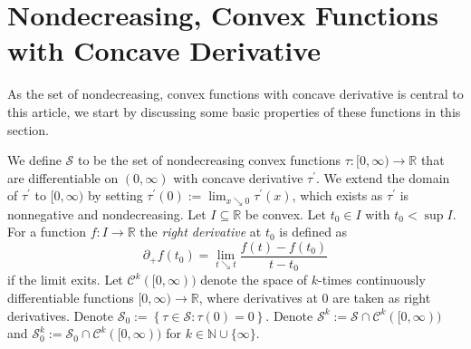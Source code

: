 \documentclass{article}
\renewcommand{\subset}{\subseteq}
\newcommand{\lcb}{\left\lbrace} %
\newcommand{\rcb}{\right\rbrace} %
\newcommand{\cb}[1]{\lcb #1 \rcb} %
\newcommand*{\mc}[1]{\mathcal{#1}}
\newcommand{\N}{\mathbb{N}}
\newcommand{\R}{\mathbb{R}}
\newcommand{\Rp}{[0, \infty)} %
\newcommand{\Rpp}{(0, \infty)} %
\newcommand{\pr}{^\prime}
\newcommand{\tran}{\tau}
\newcommand{\dtran}{\tran\pr}
\newcommand{\setcc}{\mc S}
\newcommand{\setd}[1]{\mc C^{#1}}
\newcommand{\setccd}[1]{\mc S^{#1}}
\newcommand{\setcco}{\mc S_0}
\newcommand{\setccod}[1]{\mc S_0^{#1}}
\begin{document}
\section{Nondecreasing, Convex Functions with Concave Derivative}\label{sec:cc}
%
As the set of nondecreasing, convex functions with concave derivative is central to this article, we start by discussing some basic properties of these functions in this section.

We define $\setcc$ to be the set of nondecreasing convex functions $\tran\colon\Rp\to\R$ that are differentiable on $\Rpp$ with concave derivative $\dtran$. We extend the domain of $\dtran$ to $\Rp$ by setting  $\dtran(0) := \lim_{x\searrow0} \dtran(x)$, which exists as $\dtran$ is nonnegative and nondecreasing.
Let $I\subset\R$ be convex. Let $t_0\in I$ with $t_0<\sup I$. For a function $f\colon I \to \R$ the \textit{right derivative} at $t_0$ is defined as
\begin{equation}
	\partial_+ f(t_0) = \lim_{t\searrow t}\frac{f(t)-f(t_0)}{t-t_0}
\end{equation}
if the limit exits.
Let $\setd{k}(\Rp)$ denote the space of $k$-times continuously differentiable functions $\Rp\to\R$, where derivatives at $0$ are taken as right derivatives. 
Denote $\setcco := \cb{\tran\in\setcc \colon \tran(0) = 0}$. 
Denote $\setccd{k} := \setcc\cap \setd{k}(\Rp)$ and $\setccod{k} := \setcco\cap \setd{k}(\Rp)$ for $k\in\N\cup\{\infty\}$.
%
%
%
\end{document}
